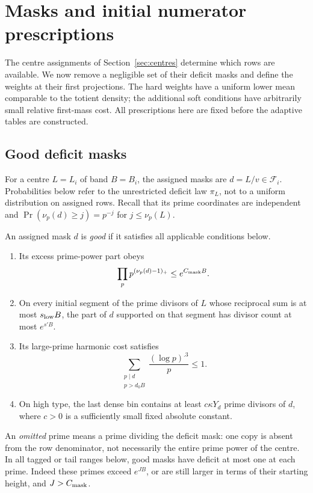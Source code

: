 \section{Masks and initial numerator prescriptions}
\label{sec:prescriptions}

The centre assignments of Section~\ref{sec:centres} determine which
rows are available. We now remove a negligible set of their deficit
masks and define the weights at their first projections. The hard
weights have a uniform lower mean comparable to the totient density;
the additional soft conditions have arbitrarily small relative
first-mass cost. All prescriptions here are fixed before the
adaptive tables are constructed.

\subsection{Good deficit masks}

For a centre $L=L_i$ of band $B=B_i$, the assigned masks are
$d=L/v\in\mathcal F_i$. Probabilities below refer to the unrestricted
deficit law $\pi_L$, not to a uniform distribution on assigned rows.
Recall that its prime coordinates are independent and
$\Pr(\nu_p(d)\ge j)=p^{-j}$ for $j\le\nu_p(L)$.

\begin{definition}
\label{pre:good-masks}
An assigned mask $d$ is \emph{good} if it satisfies all applicable
conditions below.
\begin{enumerate}
\item Its excess prime-power part obeys
\[
 \prod_p p^{(\nu_p(d)-1)_+}\le e^{C_{\rm mask}B}.
\]
\item On every initial segment of the prime divisors of $L$ whose
reciprocal sum is at most $s_{\rm low}B$, the part of $d$ supported
on that segment has divisor count at most $e^{s'B}$.
\item Its large-prime harmonic cost satisfies
\[
 \sum_{\substack{p\mid d\\p>d_0B}}\frac{(\log p)^{.3}}p\le1.
\]
\item On high type, the last dense bin contains at least
$c\kappa Y_d$ prime divisors of $d$, where $c>0$ is a sufficiently
small fixed absolute constant.
\end{enumerate}
\end{definition}

An \emph{omitted} prime means a prime dividing the deficit mask:
one copy is absent from the row denominator, not necessarily the
entire prime power of the centre. In all tagged or tail ranges below,
good masks have deficit at most one at each prime. Indeed these
primes exceed $e^{JB}$, or are still larger in terms of their starting
height, and $J>C_{\rm mask}$.

